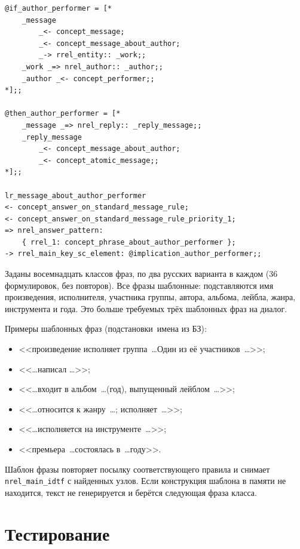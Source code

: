 \begin{lstlisting}[caption={Правило ответа, если автор входит в класс исполнителей},label={lst:rule-author},basicstyle=\footnotesize\ttfamily]
@if_author_performer = [*
	_message
		_<- concept_message;
		_<- concept_message_about_author;
		_-> rrel_entity:: _work;;
	_work _=> nrel_author:: _author;;
	_author _<- concept_performer;;
*];;

@then_author_performer = [*
	_message _=> nrel_reply:: _reply_message;;
	_reply_message
		_<- concept_message_about_author;
		_<- concept_atomic_message;;
*];;

lr_message_about_author_performer
<- concept_answer_on_standard_message_rule;
<- concept_answer_on_standard_message_rule_priority_1;
=> nrel_answer_pattern:
	{ rrel_1: concept_phrase_about_author_performer };
-> rrel_main_key_sc_element: @implication_author_performer;;
\end{lstlisting}

Заданы восемнадцать классов фраз, по два русских варианта в каждом (36 формулировок, без повторов). Все фразы шаблонные: подставляются имя произведения, исполнителя, участника группы, автора, альбома, лейбла, жанра, инструмента и года. Это больше требуемых трёх шаблонных фраз на диалог.

Примеры шаблонных фраз (подстановки~\mdash  имена из БЗ):
\begin{itemize}
	\item <<произведение исполняет группа~\ldots Один из её участников~\mdash  \ldots>>;
	\item <<\ldots написал \ldots>>;
	\item <<\ldots входит в альбом~\ldots (год), выпущенный лейблом~\ldots>>;
	\item <<\ldots относится к жанру~\ldots; исполняет~\ldots>>;
	\item <<\ldots исполняется на инструменте~\ldots>>;
	\item <<премьера~\ldots состоялась в~\ldots году>>.
\end{itemize}

Шаблон фразы повторяет посылку соответствующего правила и снимает \texttt{nrel\_main\_idtf} с найденных узлов. Если конструкция шаблона в памяти не находится, текст не генерируется и берётся следующая фраза класса.

\section{Тестирование}
\label{sec:test}

